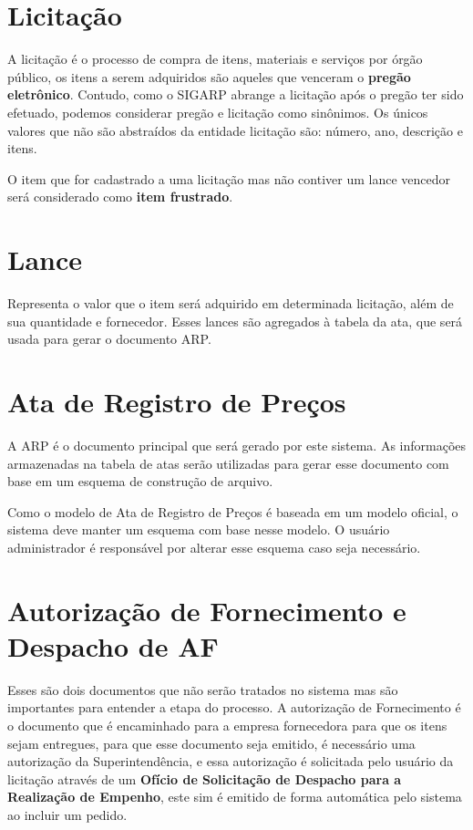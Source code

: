 \documentclass[ ]{article}
\begin{document}
\section{Licitação}
	A licitação é o processo de compra de itens, materiais e serviços por órgão público, os itens a serem adquiridos são aqueles que venceram o \textbf{pregão eletrônico}. Contudo, como o SIGARP abrange a licitação após o pregão ter sido efetuado, podemos considerar pregão e licitação como sinônimos. Os únicos valores que não são abstraídos da entidade licitação são: número, ano, descrição e itens.
	
	O item que for cadastrado a uma licitação mas não contiver um lance vencedor será considerado como \textbf{item frustrado}.
	
\section{Lance}
	Representa o valor que o item será adquirido em determinada licitação, além de sua quantidade e fornecedor. Esses lances são agregados à tabela da ata, que será usada para gerar o documento ARP.

\section{Ata de Registro de Preços}
	A ARP é o documento principal que será gerado por este sistema. As informações armazenadas na tabela de atas serão utilizadas para gerar esse documento com base em um esquema de construção de arquivo. 
	
	Como o modelo de Ata de Registro de Preços é baseada em um modelo oficial, o sistema deve manter um esquema com base nesse modelo. O usuário administrador é responsável por alterar esse esquema caso seja necessário.
	
\section{Autorização de Fornecimento e Despacho de AF}
	Esses são dois documentos que não serão tratados no sistema mas são importantes para entender a etapa do processo. A autorização de Fornecimento é o documento que é encaminhado para a empresa fornecedora para que os itens sejam entregues, para que esse documento seja emitido, é necessário uma autorização da Superintendência, e essa autorização é solicitada pelo usuário da licitação através  de um \textbf{Ofício de Solicitação de Despacho para a Realização de Empenho}, este sim é emitido de forma automática pelo sistema ao incluir um pedido.
	
\end{document}
